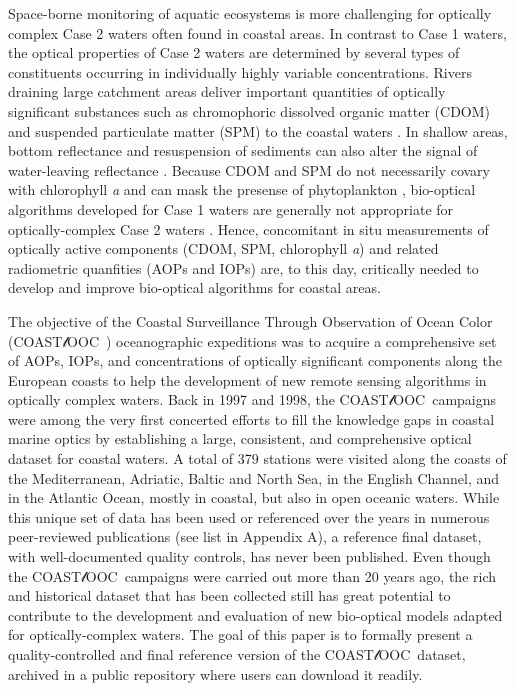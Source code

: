 \documentclass[essd, manuscript]{copernicus}
\newcommand{\coastlooc}{COAST$\mathscr{l}$OOC~\allowbreak}
\begin{document}
Space-borne monitoring of aquatic ecosystems is more challenging for optically complex Case 2 waters \citep{Morel1977} often found in coastal areas. In contrast to Case 1 waters, the optical properties of Case 2 waters are determined by several types of constituents occurring in individually highly variable concentrations. Rivers draining large catchment areas deliver important quantities of optically significant substances such as chromophoric dissolved organic matter (CDOM) and suspended particulate matter (SPM) to the coastal waters \citep{Hedges1997, Cole2007, Massicotte2017}. In shallow areas, bottom reflectance and resuspension of sediments can also alter the signal of water-leaving reflectance \citep{Lee1998}. Because CDOM and SPM do not necessarily covary with chlorophyll \textit{a} and can mask the presense of phytoplankton \citep{ioccg2000}, bio-optical algorithms developed for Case 1 waters are generally not appropriate for optically-complex Case 2 waters \citep{Gordon1983}. Hence, concomitant in situ measurements of optically active components (CDOM, SPM, chlorophyll \textit{a}) and related radiometric quanfities (AOPs and IOPs) are, to this day, critically needed to develop and improve bio-optical algorithms for coastal areas.

The objective of the Coastal Surveillance Through Observation of Ocean Color (\coastlooc) oceanographic expeditions was to acquire a comprehensive set of AOPs, IOPs, and concentrations of optically significant components along the European coasts to help the development of new remote sensing algorithms in optically complex waters. Back in 1997 and 1998, the \coastlooc campaigns were among the very first concerted efforts to fill the knowledge gaps in coastal marine optics by establishing a large, consistent, and comprehensive optical dataset for coastal waters. A total of 379 stations were visited along the coasts of the Mediterranean, Adriatic, Baltic and North Sea, in the English Channel, and in the Atlantic Ocean, mostly in coastal, but also in open oceanic waters. While this unique set of data has been used or referenced over the years in numerous peer-reviewed publications  (see list in Appendix A), a reference final dataset, with well-documented quality controls, has never been published. Even though the \coastlooc campaigns were carried out more than 20 years ago, the rich and historical dataset that has been collected still has great potential to contribute to the development and evaluation of new bio-optical models adapted for optically-complex waters. The goal of this paper is to formally present a quality-controlled and final reference version of the \coastlooc dataset, archived in a public repository where users can download it readily.
\end{document}
